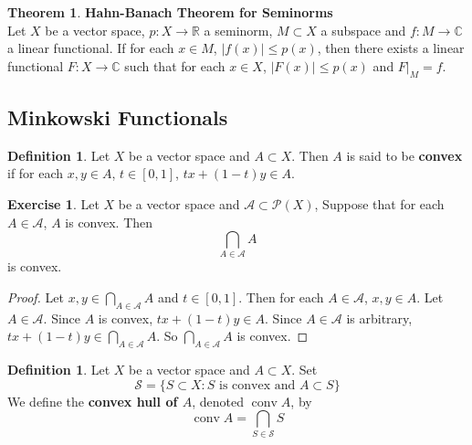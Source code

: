 \documentclass[12pt]{amsart}
\theoremstyle{definition}
\newtheorem{defn}[definition]{Definition}
\newtheorem{thm}[definition]{Theorem}
\newtheorem{ex}[definition]{Exercise}
\newcommand{\C}{\mathbb{C}}
\newcommand{\R}{\mathbb{R}}
\newcommand{\MA}{\mathcal{A}}
\newcommand{\MS}{\mathcal{S}}
\newcommand{\MP}{\mathcal{P}}
\DeclareMathOperator{\cnv}{conv}
\begin{document}
	\begin{thm}\textbf{Hahn-Banach Theorem for Seminorms}\\
		Let $X$ be a vector space, $p:X \rightarrow \R$ a seminorm, $M \subset X$ a subspace and $f:M \rightarrow \C$ a linear functional. If for each $x \in M$, $\vert f(x) \vert \leq p(x)$, then there exists a linear functional $F:X \rightarrow \C$ such that for each $x \in X$, $\vert F(x) \vert \leq p(x)$ and $F|_{M}=f$.
	\end{thm}	






















	
	\newpage
	\subsection{Minkowski Functionals}

	\begin{defn}
		Let $X$ be a vector space and $A \subset X$. Then $A$ is said to be \textbf{convex} if for each $x, y \in A$, $t \in [0,1]$, $tx +(1-t)y \in A$.
	\end{defn}

	\begin{ex}
		Let $X$ be a vector space and $\MA \subset \MP(X)$, Suppose that for each $A \in \MA$, $A$ is convex. Then $$\bigcap_{A \in \MA} A$$ is convex.
	\end{ex}

	\begin{proof}
		Let $x,y \in \bigcap\limits_{A \in \MA} A$ and $t \in [0,1]$. Then for each $A \in \MA$, $x,y \in A$. Let $A \in \MA$. Since $A$ is convex, $tx + (1-t)y \in A$. Since $A \in \MA$ is arbitrary, $tx + (1-t)y \in \bigcap\limits_{A \in \MA} A$. So $\bigcap\limits_{A \in \MA} A $ is convex.
	\end{proof}

	\begin{defn}
		Let $X$ be a vector space and $A \subset X$. Set 
		$$\MS = \{S \subset X: S \text{ is convex and } A \subset S\}$$ 
		We define the \textbf{convex hull of $A$}, denoted $\cnv A$, by $$\cnv A = \bigcap_{S \in \MS}S$$
	\end{defn}
\end{document}
